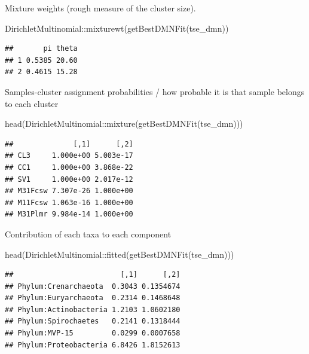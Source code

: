 \documentclass[
]{book}
\newenvironment{Shaded}{\begin{snugshade}}{\end{snugshade}}
\newcommand{\FunctionTok}[1]{\textcolor[rgb]{0.00,0.00,0.00}{#1}}
\newcommand{\NormalTok}[1]{#1}
\newcommand{\SpecialCharTok}[1]{\textcolor[rgb]{0.00,0.00,0.00}{#1}}
\begin{document}
Mixture weights (rough measure of the cluster size).

\begin{Shaded}
\begin{Highlighting}[]
\NormalTok{DirichletMultinomial}\SpecialCharTok{::}\FunctionTok{mixturewt}\NormalTok{(}\FunctionTok{getBestDMNFit}\NormalTok{(tse\_dmn))}
\end{Highlighting}
\end{Shaded}

\begin{verbatim}
##       pi theta
## 1 0.5385 20.60
## 2 0.4615 15.28
\end{verbatim}

Samples-cluster assignment probabilities / how probable it is that sample belongs
to each cluster

\begin{Shaded}
\begin{Highlighting}[]
\FunctionTok{head}\NormalTok{(DirichletMultinomial}\SpecialCharTok{::}\FunctionTok{mixture}\NormalTok{(}\FunctionTok{getBestDMNFit}\NormalTok{(tse\_dmn)))}
\end{Highlighting}
\end{Shaded}

\begin{verbatim}
##              [,1]      [,2]
## CL3     1.000e+00 5.003e-17
## CC1     1.000e+00 3.868e-22
## SV1     1.000e+00 2.017e-12
## M31Fcsw 7.307e-26 1.000e+00
## M11Fcsw 1.063e-16 1.000e+00
## M31Plmr 9.984e-14 1.000e+00
\end{verbatim}

Contribution of each taxa to each component

\begin{Shaded}
\begin{Highlighting}[]
\FunctionTok{head}\NormalTok{(DirichletMultinomial}\SpecialCharTok{::}\FunctionTok{fitted}\NormalTok{(}\FunctionTok{getBestDMNFit}\NormalTok{(tse\_dmn)))}
\end{Highlighting}
\end{Shaded}

\begin{verbatim}
##                         [,1]      [,2]
## Phylum:Crenarchaeota  0.3043 0.1354674
## Phylum:Euryarchaeota  0.2314 0.1468648
## Phylum:Actinobacteria 1.2103 1.0602180
## Phylum:Spirochaetes   0.2141 0.1318444
## Phylum:MVP-15         0.0299 0.0007658
## Phylum:Proteobacteria 6.8426 1.8152613
\end{verbatim}
\end{document}
